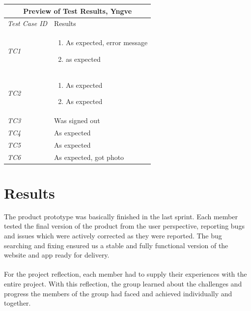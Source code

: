 \begin{minipage}{\linewidth}
\setlength{\tabcolsep}{15pt}
\centering
{}
\begin{tabular}{ |l|p{70mm}| }
	\hline
	\multicolumn{2}{|c|}{\cellcolor{gray!25} \textbf{Preview of Test Results, Yngve}} \\
	\hline
	\it{\cellcolor{gray!25}Test Case ID} & {\cellcolor{gray!25} Results } \\
	\hline
	\it{\cellcolor{gray!25}TC1} & \begin{enumerate}[label=\alph*)]
	                                \item As expected, error message
	                                \item as expected
	                              \end{enumerate}\\ \hline
	\it{\cellcolor{gray!25}TC2} & \begin{enumerate}[label=\alph*)]
	                                \item As expected
	                                \item As expected	
	                              \end{enumerate}\\ \hline
	\it{\cellcolor{gray!25}TC3} & Was signed out \\ \hline
	\it{\cellcolor{gray!25}TC4} & As expected \\ \hline
	\it{\cellcolor{gray!25}TC5} & As expected \\ \hline
	\it{\cellcolor{gray!25}TC6} & As expected, got photo \\ \hline
\end{tabular}
\medskip
\end{minipage}

\section{Results}
\label{sec:FinalResults}

The product prototype was basically finished in the last sprint. Each member tested the final version of the product from the user perspective, reporting bugs and issues which were actively corrected as they were reported. The bug searching and fixing ensured us a stable and fully functional version of the website and app ready for delivery. 

\paragraph{} For the project reflection, each member had to supply their experiences with the entire project. With this reflection, the group learned about the challenges and progress the members of the group had faced and achieved individually and together. 

